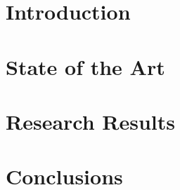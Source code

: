 \documentclass[twoside,12pt,onecolumn]{Latex/Classes/PhDthesisPSnPDF}
\begin{document}
\tableofcontents            %


\listoffigures	%
\listoftables  %




\mainmatter

\pagestyle{fancy}



\part{Introduction}
\label{sec:Part1}

%
\part{State of the Art}
\label{sec:Part2}

%
\part{Research Results}
\label{sec:Part3}

%
%
\part{Conclusions}
\label{sec:Part4}


\end{document}
